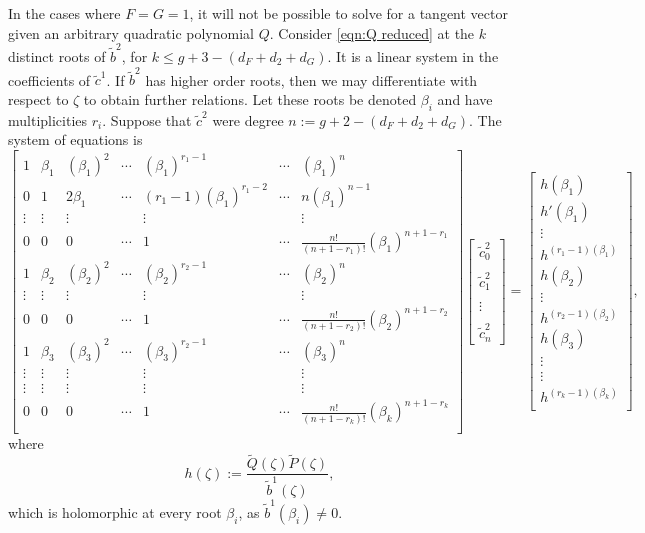 In the cases where $F=G=1$, it will not be possible to solve for a tangent vector given an arbitrary quadratic polynomial $Q$. Consider \eqref{eqn:Q reduced} at the $k$ distinct roots of $\tilde{b}^2$, for $k \leq g + 3 - (d_F + d_2 + d_G)$. It is a linear system in the coefficients of $\tilde{c}^1$. If $\tilde{b}^2$ has higher order roots, then we may differentiate with respect to $ζ$ to obtain further relations. Let these roots be denoted $β_i$ and have multiplicities $r_i$. Suppose that $\tilde{c}^2$ were degree $n := g + 2 - (d_F + d_2 + d_G)$. The system of equations is
\[
\begin{bmatrix}
1 & β_1 & (β_1)^2 & \cdots & (β_1)^{r_1-1} & \cdots & (β_1)^{n} \\
0 & 1 & 2β_1 & \cdots & (r_1-1)(β_1)^{r_1-2} & \cdots & n(β_1)^{n-1} \\
\vdots & \vdots & \vdots & & \vdots & & \vdots \\
0 & 0 & 0 & \cdots & 1 & \cdots & \frac{n!}{(n+1 - r_1)!}(β_1)^{n+1-r_1} \\
1 & β_2 & (β_2)^2 & \cdots & (β_2)^{r_2-1} & \cdots & (β_2)^{n} \\
\vdots & \vdots & \vdots & & \vdots & & \vdots \\
0 & 0 & 0 & \cdots & 1 & \cdots & \frac{n!}{(n+1 - r_2)!}(β_2)^{n+1-r_2} \\
1 & β_3 & (β_3)^2 & \cdots & (β_3)^{r_2-1} & \cdots & (β_3)^{n} \\
\vdots & \vdots & \vdots & & \vdots & & \vdots \\
\vdots & \vdots & \vdots & & \vdots & & \vdots \\
0 & 0 & 0 & \cdots & 1 & \cdots & \frac{n!}{(n+1 - r_k)!}(β_k)^{n+1-r_k} \\
\end{bmatrix}
\begin{bmatrix}
\tilde{c}^2_0 \\~\\ \tilde{c}^2_1 \\~\\ \vdots \\~\\ \tilde{c}^2_n
\end{bmatrix}
=
\begin{bmatrix}
h(β_1) \\ h'(β_1) \\ \vdots \\ h^{(r_1-1)(β_1)} \\
h(β_2) \\ \vdots \\ h^{(r_2-1)(β_2)} \\
h(β_3) \\ \vdots \\ \vdots \\ h^{(r_k-1)(β_k)} \\
\end{bmatrix},
\]
where
\[
h(ζ) := \frac{\tilde{Q}(ζ)\tilde{P}(ζ)}{\tilde{b}^1(ζ)},
\]
which is holomorphic at every root $β_i$, as $\tilde{b}^1(β_i)\neq 0$.

